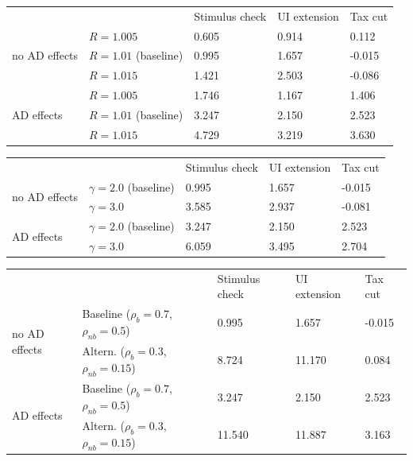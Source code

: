 
\begin{tabular}{@{}lllll@{}}
\toprule
                  &                & Stimulus check & UI extension & Tax cut \\ \cmidrule(l){1-5}
    \multirow{3}{*}{no AD effects} & $R = 1.005$ & 0.605 & 0.914 & 0.112 \\
                       & $R = 1.01$ (baseline) & 0.995 & 1.657 & -0.015 \\
                       & $R = 1.015$ & 1.421 & 2.503 & -0.086 \\ \cmidrule(l){1-5}
    \multirow{3}{*}{AD effects} & $R = 1.005$ & 1.746 & 1.167 & 1.406 \\
                       & $R = 1.01$ (baseline) & 3.247 & 2.150 & 2.523 \\
                       & $R = 1.015$ & 4.729 & 3.219 & 3.630 \\ \cmidrule(l){1-5}
\end{tabular}

\begin{tabular}{@{}lllll@{}}
\toprule
                  &                & Stimulus check & UI extension & Tax cut \\ \cmidrule(l){1-5}
    \multirow{2}{*}{no AD effects} & $\gamma = 2.0$ (baseline) & 0.995 & 1.657 & -0.015 \\
                       & $\gamma = 3.0$ & 3.585 & 2.937 & -0.081 \\ \cmidrule(l){1-5}
    \multirow{2}{*}{AD effects} & $\gamma = 2.0$ (baseline) & 3.247 & 2.150 & 2.523 \\
                       & $\gamma = 3.0$ & 6.059 & 3.495 & 2.704 \\ \cmidrule(l){1-5}
\end{tabular}

\begin{tabular}{@{}lllll@{}}
\toprule
                  &                & Stimulus check & UI extension & Tax cut \\ \cmidrule(l){1-5}
    \multirow{2}{*}{no AD effects} & Baseline ($\rho_b = 0.7$, $\rho_{nb} = 0.5$) & 0.995 & 1.657 & -0.015 \\
                       & Altern. ($\rho_b = 0.3$, $\rho_{nb} = 0.15$) & 8.724 & 11.170 & 0.084 \\ \cmidrule(l){1-5}
    \multirow{2}{*}{AD effects} & Baseline ($\rho_b = 0.7$, $\rho_{nb} = 0.5$) & 3.247 & 2.150 & 2.523 \\
                       & Altern. ($\rho_b = 0.3$, $\rho_{nb} = 0.15$) & 11.540 & 11.887 & 3.163 \\ \cmidrule(l){1-5}
\end{tabular}

